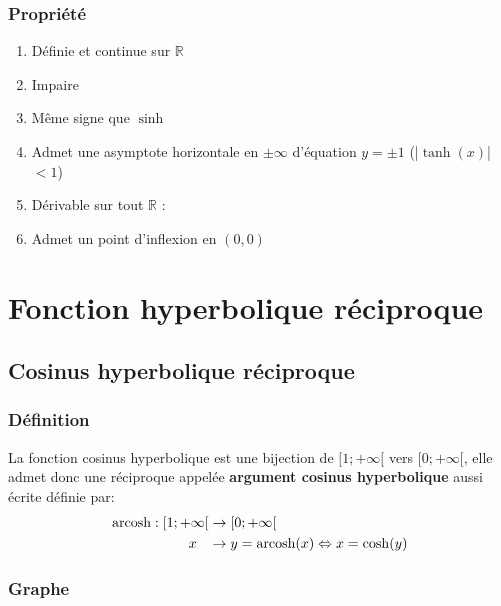 \documentclass[12pt,a4paper]{report}
\begin{document}
	\subsubsection*{Propriété}
	\begin{enumerate}
		\item Définie et continue sur $\mathbb{R}$
		\item Impaire
		\item Même signe que $\sinh$
		\item Admet une asymptote horizontale en $\pm\infty$ d'équation $y=\pm 1$ (|$\tanh(x)$|$<1$)
		\item Dérivable sur tout $\mathbb{R}$ : 
		\item Admet un point d'inflexion en $(0,0)$
	\end{enumerate}
	\section*{Fonction hyperbolique réciproque}
	\subsection*{Cosinus hyperbolique réciproque}
	\subsubsection*{Définition}
	La fonction cosinus hyperbolique est une bijection de $[1;+\infty[$ vers $[0;+\infty[$, elle admet donc une réciproque appelée \textbf{argument cosinus hyperbolique} aussi écrite 
	 définie par: 
	\begin{align*}
	\text{arcosh}: [1;+\infty[ &\rightarrow [0;+\infty[ \\
	x \hspace{0.3cm} &\rightarrow y =\text{arcosh}(x) \Leftrightarrow x=\cosh(y)
	\end{align*}
	\subsubsection*{Graphe}
\end{document}

